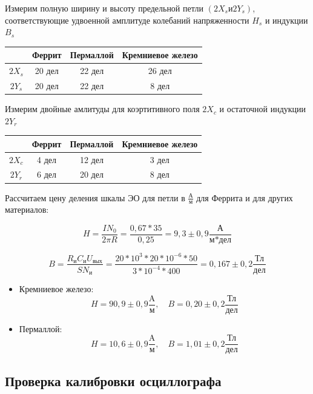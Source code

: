 \documentclass[a4paper]{article}
\begin{document}
Измерим полную ширину и высоту предельной петли $(2X_{s} и 2Y_{s})$, 
соответствующие удвоенной амплитуде колебаний напряженности $H_{s}$ и индукции $B_{s}$




\begin{tabular}{|c|c|c|c|} 
    \hline 
    &Феррит & Пермаллой & Кремниевое железо \\
    \hline 
    $2X_{s}$ & 20 дел & 22 дел & 26 дел \\
    \hline
    $2Y_{s}$  & 20 дел  & 22 дел  & 8 дел  \\
    \hline
\end{tabular}

Измерим двойные амлитуды для коэртитивного поля $2X_{c}$ и остаточной индукции $2Y_{r}$


\begin{tabular}{|c|c|c|c|} 
    \hline 
    &Феррит & Пермаллой & Кремниевое железо \\
    \hline 
    $2X_{c}$ & 4 дел & 12 дел & 3 дел \\
    \hline
    $2Y_{r}$  & 6 дел  & 20 дел  & 8 дел  \\
    \hline
\end{tabular}

\newpage

Рассчитаем цену деления шкалы ЭО для петли в $\frac{\text{А}}{\text{м}}$ для Феррита и для других материалов:

\[H = \frac{IN_{0}}{2\pi  R} = \frac{0,67*35}{0,25} = 9,3 \pm 0,9 \frac{\text{А}}{\text{м*дел}}\]

\[B = \frac{R_{\text{и}}C_{\text{и}}U_{\text{вых}}}{S N_{\text{и}}} = \frac{20*10^{3}*20*10^{-6}*50}{3*10^{-4}*400}=0,167 \pm 0,2 \frac{\text{Тл}}{\text{дел}}\]

\begin{itemize}
    \item Кремниевое железо:
    \[
    H = 90,9 \pm 0,9 \frac{\text{A}}{\text{м}}, \quad B = 0,20 \pm 0,2 \frac{\text{Тл}}{\text{дел}}\]

    
    \item Пермаллой:
    \[
    H = 10,6 \pm 0,9 \frac{\text{A}}{\text{м}}, \quad B = 1,01 \pm 0,2 \frac{\text{Тл}}{\text{дел}}\]

\end{itemize}

\subsection{Проверка калибровки осциллографа}
\end{document}
